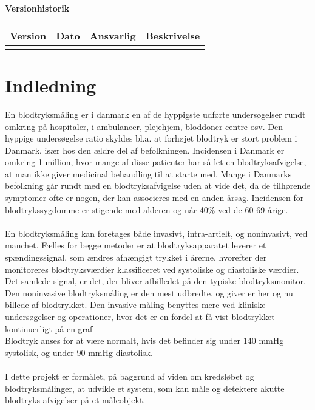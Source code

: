 \subsubsection{Versionhistorik}

\begin{longtabu} to 
    Version &    Dato &    Ansvarlig &    Beskrivelse\\[-1ex]
    \midrule
   
    	
\label{version_Systemark}
\end{longtabu}

\chapter{Indledning}

En blodtryksmåling er i danmark en af de hyppigste udførte undersøgelser rundt omkring på hospitaler, i ambulancer, plejehjem, bloddoner centre osv. 
Den hyppige undersøgelse ratio skyldes bl.a. at forhøjet blodtryk er stort problem i Danmark, især hos den ældre del af befolkningen. Incidensen i Danmark er omkring 1 million, hvor mange af disse patienter har så let en blodtryksafvigelse, at man ikke giver medicinal behandling til at starte med. Mange i Danmarks befolkning går rundt med en blodtryksafvigelse uden at vide det, da de tilhørende symptomer ofte er nogen, der kan associeres med en anden årsag. Incidensen for blodtrykssygdomme er stigende med alderen og når 40\% ved de 60-69-årige.\cite{Statistik} \\
\\
En blodtryksmåling kan foretages både invasivt, intra-artielt, og noninvasivt, ved manchet. Fælles for begge metoder er at blodtryksapparatet leverer et spændingssignal, som ændres afhængigt trykket i årerne, hvorefter der monitoreres blodtryksværdier klassificeret ved systoliske og diastoliske værdier. Det samlede signal, er det, der bliver afbilledet på den typiske blodtryksmonitor.\\
Den noninvasive blodtryksmåling er den mest udbredte, og giver er her og nu billede af blodtrykket. Den invasive måling benyttes mere ved kliniske undersøgelser og operationer, hvor det er en fordel at få vist blodtrykket kontinuerligt på en graf\\
 Blodtryk anses for at være normalt, hvis det befinder sig under 140 mmHg systolisk, og under 90 mmHg diastolisk. \\
 \\
I dette projekt er formålet, på baggrund af viden om kredsløbet og blodtryksmålinger, at udvikle et system, som kan måle og detektere akutte blodtryks afvigelser på et måleobjekt.\\ 
